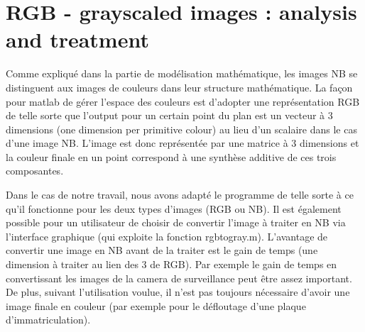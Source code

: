 \chapter{RGB - grayscaled images : analysis and treatment}

Comme expliqué dans la partie de modélisation mathématique, les images NB se distinguent aux images de couleurs dans leur structure mathématique. La façon pour matlab de gérer l'espace des couleurs est d'adopter une représentation RGB de telle sorte que l'output pour un certain point du plan est un vecteur à 3 dimensions (one dimension per primitive colour) au lieu d'un scalaire dans le cas d'une image NB. L'image est donc représentée par une matrice à 3 dimensions et la couleur finale en un point correspond à une synthèse additive de ces trois composantes.

Dans le cas de notre travail, nous avons adapté le programme de telle sorte à ce qu'il fonctionne pour les deux types d'images (RGB ou NB). Il est également possible pour un utilisateur de choisir de convertir l'image à traiter en NB via l'interface graphique (qui exploite la fonction rgbtogray.m). L'avantage de convertir une image en NB avant de la traiter est le gain de temps (une dimension à traiter au lien des 3 de RGB). Par exemple le gain de temps en convertissant les images de la camera de surveillance peut être assez important. De plus, suivant l'utilisation voulue, il n'est pas toujours nécessaire d'avoir une image finale en couleur (par exemple pour le défloutage d'une plaque d'immatriculation). 